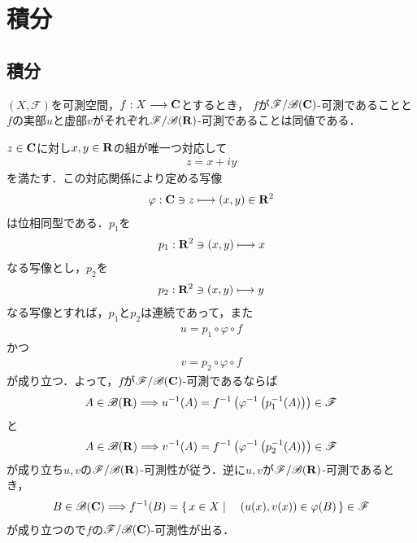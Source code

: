 \section{積分}
\subsection{積分}
	\begin{screen}
		\begin{thm}\label{thm:measurability_of_complex_measurable_functions}
			$(X,\mathscr{F})$を可測空間，$f:X \longrightarrow \mathbf{C}$とするとき，
			$f$が$\mathscr{F}/\mathscr{B}(\mathbf{C})$-可測であることと
			$f$の実部$u$と虚部$v$がそれぞれ$\mathscr{F}/\mathscr{B}(\mathbf{R})$-可測であることは同値である．
		\end{thm}
	\end{screen}
	
	\begin{prf}
		$z \in \mathbf{C}$に対し$x,y \in \mathbf{R}$の組が唯一つ対応して
		\begin{align}
			z = x + i y
		\end{align}
		を満たす．この対応関係により定める写像
		\begin{align}
			\varphi:\mathbf{C} \ni z \longmapsto (x,y) \in \mathbf{R}^2
		\end{align}
		は位相同型である．$p_1$を
		\begin{align}
			p_1:\mathbf{R}^2 \ni (x,y) \longmapsto x
		\end{align}
		なる写像とし，$p_2$を
		\begin{align}
			p_2:\mathbf{R}^2 \ni (x,y) \longmapsto y
		\end{align}
		なる写像とすれば，$p_1$と$p_2$は連続であって，また
		\begin{align}
			u = p_1 \circ \varphi \circ f
		\end{align}
		かつ
		\begin{align}
			v = p_2 \circ \varphi \circ f
		\end{align}
		が成り立つ．よって，$f$が$\mathscr{F}/\mathscr{B}(\mathbf{C})$-可測であるならば
		\begin{align}
			A \in \mathscr{B}(\mathbf{R}) \Longrightarrow
			u^{-1}(A) = f^{-1} \left( \varphi^{-1} \left( p_1^{-1}(A) \right)\right) \in \mathscr{F}
		\end{align}
		と
		\begin{align}
			A \in \mathscr{B}(\mathbf{R}) \Longrightarrow v^{-1}(A) = f^{-1} \left( \varphi^{-1} \left( p_2^{-1}(A)\right)\right) \in \mathscr{F}
		\end{align}
		が成り立ち$u,v$の$\mathscr{F}/\mathscr{B}(\mathbf{R})$-可測性が従う．逆に$u,v$が$\mathscr{F}/\mathscr{B}(\mathbf{R})$-可測であるとき，
		\begin{align}
			B \in \mathscr{B}(\mathbf{C}) \Longrightarrow f^{-1}(B) = \left\{\, x \in X \mid \quad (u(x),v(x)) \in \varphi(B)\, \right\} \in \mathscr{F}
		\end{align}
		が成り立つので$f$の$\mathscr{F}/\mathscr{B}(\mathbf{C})$-可測性が出る．
		\QED
	\end{prf}
	
